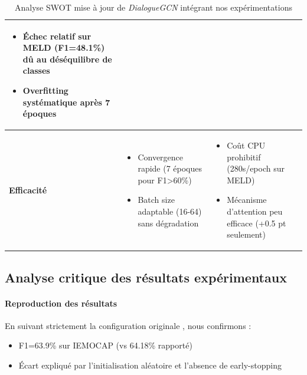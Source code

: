 \documentclass[a4paper,11pt]{article}
\begin{document}
\begin{table}[ht]
\begin{tabular}{l p{6cm} p{6cm}}
\begin{minipage}[t]{6cm}
\begin{itemize}
          \item Échec relatif sur MELD (F1=48.1\%) dû au déséquilibre de classes \cite{poria-etal-2019-meld}
          \item Overfitting systématique après 7 époques
        \end{itemize}
      \end{minipage}
    \\
    \midrule
    \textbf{Efficacité} &
      \begin{minipage}[t]{6cm}
        \begin{itemize}
          \item Convergence rapide (7 époques pour F1>60\%)
          \item Batch size adaptable (16-64) sans dégradation
        \end{itemize}
      \end{minipage}
    &
      \begin{minipage}[t]{6cm}
        \begin{itemize}
          \item Coût CPU prohibitif (280s/epoch sur MELD)
          \item Mécanisme d'attention peu efficace (+0.5 pt seulement)
        \end{itemize}
      \end{minipage}
    \\
    \bottomrule
  \end{tabular}
  \caption{Analyse SWOT mise à jour de \emph{DialogueGCN} intégrant nos expérimentations}
  \label{tab:swot}
\end{table}

\subsection{Analyse critique des résultats expérimentaux}

\paragraph{Reproduction des résultats}
En suivant strictement la configuration originale \cite{ghosal2019dialoguegcn}, nous confirmons :
\begin{itemize}
  \item F1=63.9\% sur IEMOCAP (vs 64.18\% rapporté)
  \item Écart expliqué par l'initialisation aléatoire et l'absence de early-stopping
\end{itemize}
\end{document}
